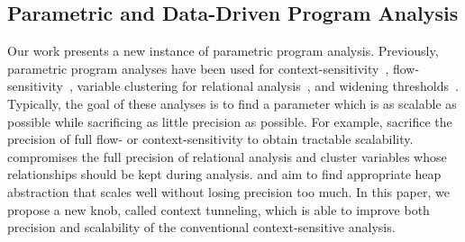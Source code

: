 \subsection{Parametric and Data-Driven Program Analysis}

Our work presents a new instance of parametric program analysis.
Previously, parametric program analyses have been used for
context-sensitivity~\cite{Tan2017,Oh2014, JeJeChOh17, Liang2011learning, Zhang2014,Liang2011}, flow-sensitivity~\cite{Oh2015}, variable clustering for
relational analysis~\cite{Heo2016learning}, and widening
thresholds~\cite{cha2016learning}.
Typically, the goal of these analyses is to find a parameter which
is as scalable as possible while sacrificing as little precision as possible.
For example,
\citet{Oh2015,Oh2014,Smaragdakis2014, JeJeChOh17, Liang2011learning}
sacrifice the precision of full flow- or context-sensitivity to obtain
tractable scalability.
\citet{Heo2016learning} compromises the full precision of relational
analysis and cluster variables whose relationships should be kept
during analysis.
\citet{Hassanshahi2017} and \citet{Tan2017} aim to find appropriate heap
abstraction that scales well without losing precision too much.
In this paper, we propose a new knob, called context tunneling, which
is able to improve both precision and scalability of the conventional
context-sensitive analysis.


